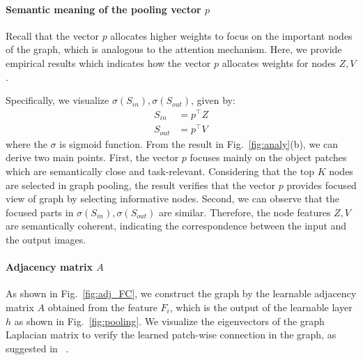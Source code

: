 \documentclass[letterpaper]{article} %
\begin{document}
% 


\paragraph{Semantic meaning of the pooling vector $p$ }
Recall that the vector $p$ allocates higher weights to focus on the important nodes of the graph, which is analogous to the attention mechanism. 
Here, we provide empirical results which indicates how the vector $p$ allocates weights for nodes $Z, V$.


Specifically, we visualize $\sigma(S_{in}), \sigma(S_{out})$, given by:
\begin{align}
	S_{in} &= p^\top Z \\
	S_{out} &= p^\top V
\end{align}
where the $\sigma$ is sigmoid function.
From the result in Fig.~\ref{fig:analy}(b), we can derive two main points. 
First, the vector $p$ focuses mainly on the object patches which are semantically close and task-relevant. 
Considering that the top $K$ nodes are selected in graph pooling, the result verifies that the vector $p$ provides focused view of graph by selecting informative nodes.
Second, we can observe that the focused parts in $\sigma(S_{in}), \sigma(S_{out})$ are similar. Therefore, the node features $Z, V$ are semantically coherent, indicating the correspondence between the input and the output images. 




\paragraph{Adjacency matrix $A$}
As shown in Fig.~\ref{fig:adj_FC}, 
we construct the graph by the learnable adjacency matrix $A$ obtained from the feature $F_i$, which is the output of the learnable layer $h$ as shown in Fig.~\ref{fig:pooling}. We visualize the eigenvectors of the graph Laplacian matrix to verify the learned patch-wise connection in the graph, as suggested in ~\cite{deepSpectral}. 
\end{document}
